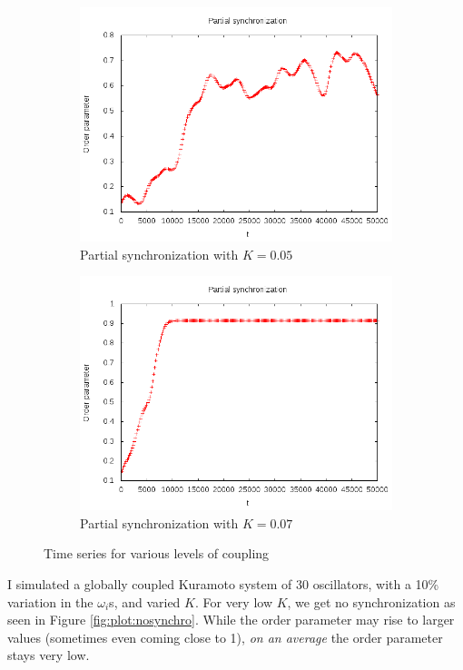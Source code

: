 \documentclass[12pt]{article}
\begin{document}
\begin{figure}
\begin{subfigure}[b]{0.4\textwidth}
\includegraphics[width=\textwidth]{data/partialsm}
\caption{Partial synchronization with $K=0.05$}
\label{fig:plot:partial1}
\end{subfigure}
\begin{subfigure}[b]{0.4\textwidth}
\centering
\includegraphics[width=\textwidth]{data/partialmore}
\caption{Partial synchronization with $K=0.07$}
\label{fig:plot:partial2}
\end{subfigure}
\caption{Time series for various levels of coupling}
\end{figure}

I simulated a globally coupled Kuramoto system of 30 oscillators, with a 10\% variation in the $\omega_i$s, and varied $K$. For very low $K$, we get no synchronization as seen in Figure \ref{fig:plot:nosynchro}. While the order parameter may rise to larger values (sometimes even coming close to 1), \emph{on an average} the order parameter stays very low.
\end{document}
